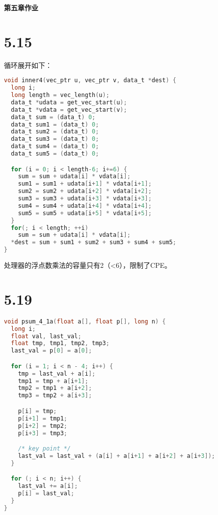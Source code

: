 \documentclass[11pt]{article}
\begin{document}
\begin{center}
  \textbf{\Huge{第五章作业}}
\end{center}

\section*{5.15}

循环展开如下：
\begin{lstlisting}[language=c]
void inner4(vec_ptr u, vec_ptr v, data_t *dest) {
  long i;
  long length = vec_length(u);
  data_t *udata = get_vec_start(u);
  data_t *vdata = get_vec_start(v);
  data_t sum = (data_t) 0;
  data_t sum1 = (data_t) 0;
  data_t sum2 = (data_t) 0;
  data_t sum3 = (data_t) 0;
  data_t sum4 = (data_t) 0;
  data_t sum5 = (data_t) 0;

  for (i = 0; i < length-6; i+=6) {
    sum = sum + udata[i] * vdata[i];
    sum1 = sum1 + udata[i+1] * vdata[i+1];
    sum2 = sum2 + udata[i+2] * vdata[i+2];
    sum3 = sum3 + udata[i+3] * vdata[i+3];
    sum4 = sum4 + udata[i+4] * vdata[i+4];
    sum5 = sum5 + udata[i+5] * vdata[i+5];
  }
  for(; i < length; ++i)
    sum = sum + udata[i] * vdata[i];
  *dest = sum + sum1 + sum2 + sum3 + sum4 + sum5;
}
\end{lstlisting}
处理器的浮点数乘法的容量只有2（<6），限制了CPE。

\section*{5.19}
\begin{lstlisting}[language=c]
void psum_4_1a(float a[], float p[], long n) {
  long i;
  float val, last_val;
  float tmp, tmp1, tmp2, tmp3;
  last_val = p[0] = a[0];

  for (i = 1; i < n - 4; i++) {
    tmp = last_val + a[i];
    tmp1 = tmp + a[i+1];
    tmp2 = tmp1 + a[i+2];
    tmp3 = tmp2 + a[i+3];

    p[i] = tmp;
    p[i+1] = tmp1;
    p[i+2] = tmp2;
    p[i+3] = tmp3;

    /* key point */
    last_val = last_val + (a[i] + a[i+1] + a[i+2] + a[i+3]);
  }

  for (; i < n; i++) {
    last_val += a[i];
    p[i] = last_val;
  }
}
\end{lstlisting}
\end{document}
